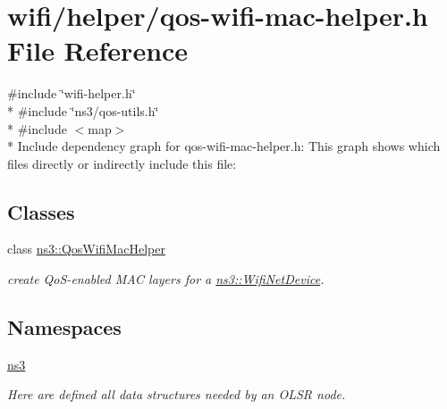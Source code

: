\hypertarget{qos-wifi-mac-helper_8h}{}\section{wifi/helper/qos-\/wifi-\/mac-\/helper.h File Reference}
\label{qos-wifi-mac-helper_8h}
{\ttfamily \#include \char`\"{}wifi-\/helper.\+h\char`\"{}}\\*
{\ttfamily \#include \char`\"{}ns3/qos-\/utils.\+h\char`\"{}}\\*
{\ttfamily \#include $<$map$>$}\\*
Include dependency graph for qos-\/wifi-\/mac-\/helper.h\+:
This graph shows which files directly or indirectly include this file\+:
\subsection*{Classes}
\begin{DoxyCompactItemize}
\item 
class \hyperlink{classns3_1_1QosWifiMacHelper}{ns3\+::\+Qos\+Wifi\+Mac\+Helper}
\begin{DoxyCompactList}\small\item\em create Qo\+S-\/enabled M\+AC layers for a \hyperlink{classns3_1_1WifiNetDevice}{ns3\+::\+Wifi\+Net\+Device}. \end{DoxyCompactList}\end{DoxyCompactItemize}
\subsection*{Namespaces}
\begin{DoxyCompactItemize}
\item 
 \hyperlink{namespacens3}{ns3}
\begin{DoxyCompactList}\small\item\em Here are defined all data structures needed by an O\+L\+SR node. \end{DoxyCompactList}\end{DoxyCompactItemize}
